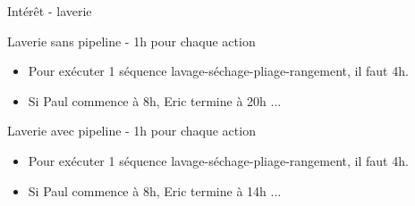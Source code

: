 %
\begin{Frame}{Intérêt - laverie}


\begin{block}{Laverie sans pipeline - 1h pour chaque action}
       \begin{center}
 	\begin{itemize}
         \item Pour exécuter 1 séquence lavage-séchage-pliage-rangement, il faut 4h.
	\item Si Paul commence à 8h, Eric termine à 20h ...
        \end{itemize}
       \end{center}
      \end{block}   

\begin{block}{Laverie avec pipeline - 1h pour chaque action}
       \begin{center}
 	\begin{itemize}
         \item Pour exécuter 1 séquence lavage-séchage-pliage-rangement, il faut 4h.
	 \item Si Paul commence à 8h, Eric termine à 14h ...
        \end{itemize}
       \end{center}
      \end{block}   

\end{Frame}


